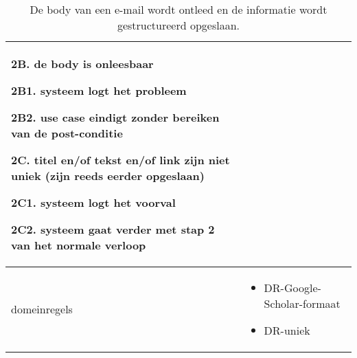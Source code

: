 \begin{table}[ptb]
\begin{tabular}{ | m{5cm} | m{10cm}| }
\begin{description}
            \item 2B. de body is onleesbaar
            \item 2B1. systeem logt het probleem
            \item 2B2. use case eindigt zonder bereiken van de post-conditie
            \item 2C. titel en/of tekst en/of link zijn niet uniek (zijn reeds eerder opgeslaan)
            \item 2C1. systeem logt het voorval
            \item 2C2. systeem gaat verder met stap 2 van het normale verloop
        \end{description} \\ 
        \hline
        domeinregels & \begin{itemize}
            \item DR-Google-Scholar-formaat
            \item DR-uniek
            \end{itemize}
        \hline
    \end{tabular}
    \caption{De body van een e-mail wordt ontleed en de informatie wordt gestructureerd opgeslaan.}
\end{table}

